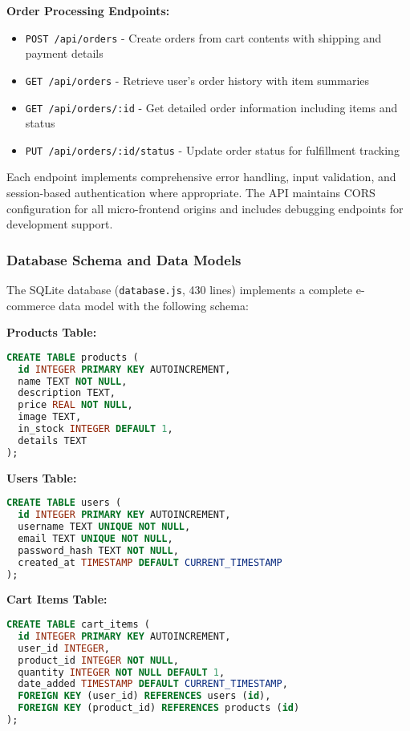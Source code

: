 \documentclass[12pt,a4paper]{report}
\begin{document}
\textbf{Order Processing Endpoints:}
\begin{itemize}
\item \texttt{POST /api/orders} - Create orders from cart contents with shipping and payment details
\item \texttt{GET /api/orders} - Retrieve user's order history with item summaries
\item \texttt{GET /api/orders/:id} - Get detailed order information including items and status
\item \texttt{PUT /api/orders/:id/status} - Update order status for fulfillment tracking
\end{itemize}

Each endpoint implements comprehensive error handling, input validation, and session-based authentication where appropriate. The API maintains CORS configuration for all micro-frontend origins and includes debugging endpoints for development support.

\subsubsection{Database Schema and Data Models}

The SQLite database (\texttt{database.js}, 430 lines) implements a complete e-commerce data model with the following schema:

\textbf{Products Table:}
\begin{lstlisting}[language=SQL, caption=Products Table Schema]
CREATE TABLE products (
  id INTEGER PRIMARY KEY AUTOINCREMENT,
  name TEXT NOT NULL,
  description TEXT,
  price REAL NOT NULL,
  image TEXT,
  in_stock INTEGER DEFAULT 1,
  details TEXT
);
\end{lstlisting}

\textbf{Users Table:}
\begin{lstlisting}[language=SQL, caption=Users Table Schema]
CREATE TABLE users (
  id INTEGER PRIMARY KEY AUTOINCREMENT,
  username TEXT UNIQUE NOT NULL,
  email TEXT UNIQUE NOT NULL,
  password_hash TEXT NOT NULL,
  created_at TIMESTAMP DEFAULT CURRENT_TIMESTAMP
);
\end{lstlisting}

\textbf{Cart Items Table:}
\begin{lstlisting}[language=SQL, caption=Cart Items Table Schema]
CREATE TABLE cart_items (
  id INTEGER PRIMARY KEY AUTOINCREMENT,
  user_id INTEGER,
  product_id INTEGER NOT NULL,
  quantity INTEGER NOT NULL DEFAULT 1,
  date_added TIMESTAMP DEFAULT CURRENT_TIMESTAMP,
  FOREIGN KEY (user_id) REFERENCES users (id),
  FOREIGN KEY (product_id) REFERENCES products (id)
);
\end{lstlisting}
\end{document}
